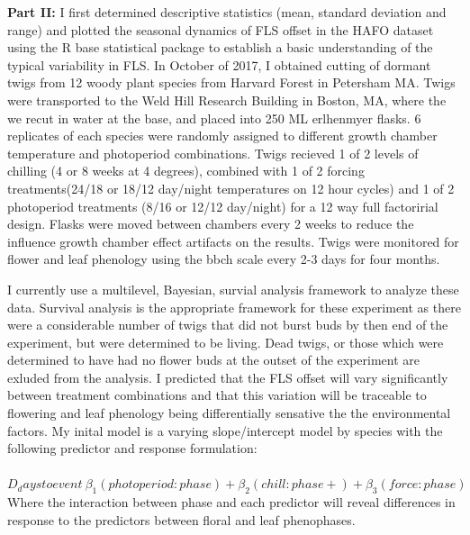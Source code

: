\documentclass{article}\usepackage[]{graphicx}\usepackage[]{color}
\begin{document}
\textbf{Part II:} I first determined descriptive statistics (mean, standard deviation and range) and plotted the seasonal dynamics of FLS offset in the HAFO dataset using the R base statistical package to establish a basic understanding of the typical variability in FLS. In October of 2017, I obtained cutting of dormant twigs from 12 woody plant species from Harvard Forest in Petersham MA. Twigs were transported to the Weld Hill Research Building in Boston, MA, where the we recut in water at the base, and placed into 250 ML erlhenmyer flasks. 6 replicates of each species were randomly assigned to different growth chamber temperature and photoperiod combinations. Twigs recieved 1 of 2 levels of chilling (4 or 8 weeks at 4 degrees), combined with 1 of 2 forcing treatments(24/18 or 18/12 day/night temperatures on 12 hour cycles) and 1 of 2 photoperiod treatments (8/16 or 12/12 day/night) for a 12 way full factoririal design. Flasks were moved between chambers every 2 weeks to reduce the influence growth chamber effect artifacts on the results. Twigs were monitored for flower and leaf phenology using the bbch scale \citep{Finn2007} every 2-3 days for four months.
\par I currently  use a multilevel, Bayesian, survial analysis framework to analyze these data. Survival analysis is the appropriate framework for these experiment as there were a considerable number of twigs that did not burst buds by then end of the experiment, but were determined to be living. Dead twigs, or those which were determined to have had no flower buds at the outset of the experiment are exluded from the analysis. I predicted that the FLS offset will vary significantly between treatment combinations and that this variation will be traceable to flowering and leaf phenology being differentially sensative the the environmental factors. My inital model is a varying slope/intercept model by species with the following predictor and response formulation:\\
\\
$D_daystoevent~\beta_1(photoperiod:phase)+\beta_2(chill:phase+)+\beta_3 (force:phase) $\\

Where the interaction between phase and each predictor will reveal differences in response to the predictors between floral and leaf phenophases.\\
\end{document}
